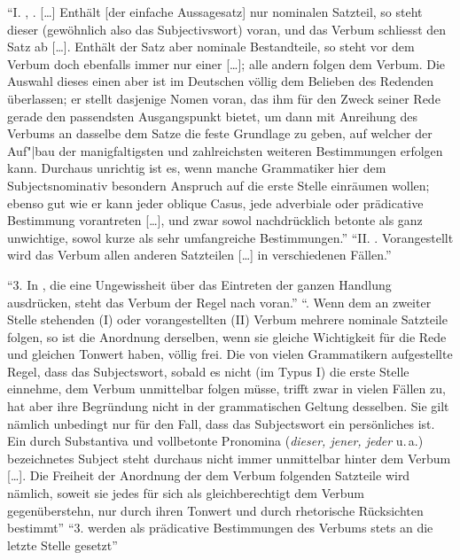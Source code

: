 \documentclass[output=paper]{langsci/langscibook}
\begin{document}
\begin{exe}
\ex\label{ex:1-5-1}
\begin{xlist}
\ex\label{ex:1-5-1a} "`I. , \dash {}. [\ldots] Enthält [der einfache Aussagesatz] nur  nominalen Satzteil, so steht dieser (gewöhnlich also das Subjectivswort) voran, und das Verbum schliesst den Satz ab [\ldots]. Enthält der Satz
aber  nominale Bestandteile, so steht vor dem Verbum doch ebenfalls immer nur einer [\ldots]; alle andern folgen dem Verbum. Die Auswahl
dieses einen aber ist im Deutschen völlig dem Belieben des Redenden überlassen; er stellt dasjenige Nomen voran, das ihm für den Zweck seiner Rede
gerade den passendsten Ausgangspunkt bietet, um dann mit Anreihung des
Verbums an dasselbe dem Satze die feste Grundlage zu geben, auf welcher
der Auf"|bau der manigfaltigsten und zahlreichsten weiteren Bestimmungen
erfolgen kann. Durchaus unrichtig ist es, wenn manche Grammatiker hier
dem Subjectsnominativ besondern Anspruch auf die erste Stelle einräumen
wollen; ebenso gut wie er kann jeder oblique Casus, jede adverbiale oder
prädicative Bestimmung vorantreten [\ldots], und zwar sowol nachdrücklich
betonte als ganz unwichtige, sowol kurze als sehr umfangreiche 
Bestimmungen."' \citep[182f]{Erdmann1886}
\ex\label{ex:1-5-1b} "`II. . Vorangestellt wird das Verbum allen anderen Satzteilen [\ldots] in verschiedenen Fällen."'  \citep[186]{Erdmann1886}

"`3. In , die eine Ungewissheit über das Eintreten der
ganzen Handlung ausdrücken, steht das Verbum der Regel nach voran."'
 \citep[188]{Erdmann1886}
\addlines[2]
\ex\label{ex:1-5-1c} "`. Wenn dem an zweiter Stelle stehenden (I) oder
vorangestellten (II) Verbum mehrere nominale Satzteile folgen, so ist
die Anordnung derselben, wenn sie gleiche Wichtigkeit für die Rede und
gleichen Tonwert haben, völlig frei. Die von vielen Grammatikern
aufgestellte Regel, dass das Subjectswort, sobald es nicht (im Typus
I) die erste Stelle einnehme, dem Verbum unmittelbar folgen müsse,
trifft zwar in vielen Fällen zu, hat aber ihre Begründung nicht in der
grammatischen Geltung desselben. Sie gilt nämlich unbedingt nur für
den Fall, dass das Subjectswort ein persönliches  ist. Ein
durch Substantiva und vollbetonte Pronomina (\textit{dieser, jener, jeder}
u.\,a.) bezeichnetes Subject steht durchaus nicht immer unmittelbar
hinter dem Verbum [\ldots]. Die Freiheit der Anordnung der dem Verbum
folgenden Satzteile wird nämlich, soweit sie jedes für sich als
gleichberechtigt dem Verbum gegenüberstehn, nur durch ihren Tonwert
und durch rhetorische Rücksichten bestimmt"'  \citep[189]{Erdmann1886}
\ex\label{ex:1-5-1d} "`3.  werden als
prädicative Bestimmungen des Verbums stets an die letzte Stelle
gesetzt"'  \citep[191]{Erdmann1886}
\end{xlist}
\end{exe}
\end{document}
